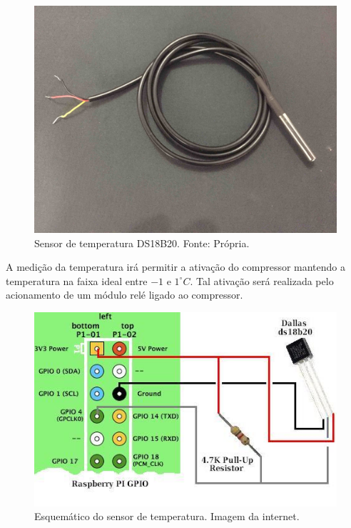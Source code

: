 \begin{figure}[!htb]
            \centering
         	\includegraphics[scale= 0.1]{figuras/temperatura.jpg}
            \caption{Sensor de temperatura DS18B20. Fonte: Própria.}
            \label{sensor-temperatura}
\end{figure}
               
	A medição da temperatura irá permitir a ativação do compressor mantendo a temperatura na faixa ideal entre $-1$ e $1 ^\circ C$. Tal ativação será realizada pelo acionamento de um módulo relé  ligado ao compressor. 
    
\begin{figure}[!htb]
           \centering
           \includegraphics[scale= 0.8]{figuras/esquema.jpg}
            \caption{Esquemático do sensor de temperatura. Imagem da internet.}
            \label{esquema-temperatura}
\end{figure}    
    
